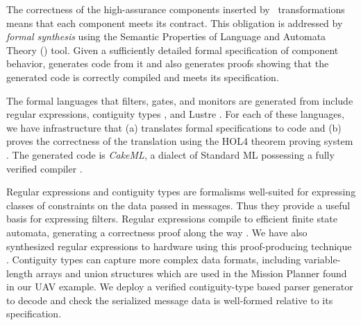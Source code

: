 The correctness of the high-assurance components inserted by \briefcase \
transformations means that each component 
meets its \agree{} contract. This obligation is addressed by
\emph{formal synthesis} using the Semantic Properties of Language 
and Automata Theory (\splat) tool.  Given a sufficiently detailed formal
specification of component behavior, \splat{} generates code
from it and also generates proofs showing that the generated code is
correctly compiled and meets its specification.

The formal languages that filters, gates, and monitors are generated
from include regular expressions, contiguity types
\cite{contiguity-types}, and Lustre \cite{lustre}. For each of these
languages, we have infrastructure 
that (a) translates formal specifications to code and (b) proves the
correctness of the translation using the HOL4 theorem proving system
\cite{hol4:overview}. The generated code is \emph{CakeML}, a dialect
of Standard ML \cite{SML97} possessing a fully verified compiler
\cite{cakeml}.


Regular expressions and contiguity types are formalisms well-suited
for expressing classes of constraints on the data passed in
messages. Thus they provide a useful basis for expressing
filters. Regular expressions compile to efficient finite state
automata, generating a correctness proof along the way
\cite{case-verified-filter}.  We have also synthesized regular
expressions to hardware using this proof-producing
technique \cite{formal-filter-synth-langsec}.
Contiguity types can capture more complex
data formats, including variable-length arrays and union structures
which are used in the Mission Planner found in our UAV example.
We deploy a verified contiguity-type based parser generator
\cite{contiguity-types} to decode and check the serialized message data is well-formed
relative to its specification.

